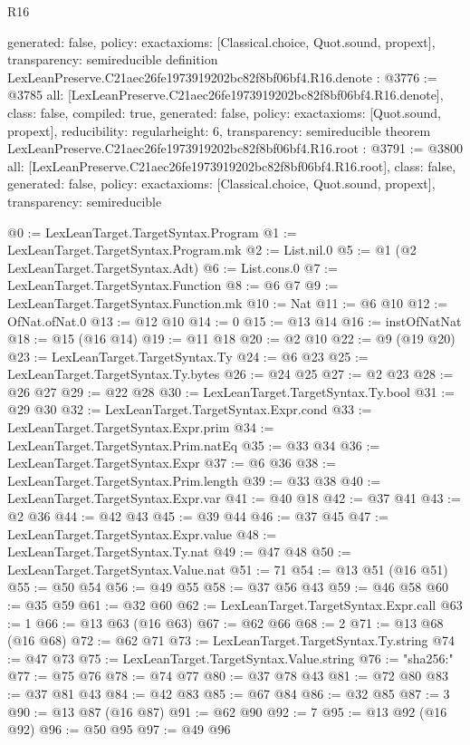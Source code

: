 \begin{lexlean}{R16}
\begin{coremodule}
{  generated: false,
  policy: exact{axioms: [Classical.choice, Quot.sound, propext]},
  transparency: semireducible
}
definition LexLeanPreserve.C21aec26fe1973919202bc82f8bf06bf4.R16.denote : @3776 := @3785 {
  all: [LexLeanPreserve.C21aec26fe1973919202bc82f8bf06bf4.R16.denote],
  class: false,
  compiled: true,
  generated: false,
  policy: exact{axioms: [Quot.sound, propext]},
  reducibility: regular{height: 6},
  transparency: semireducible
}
theorem LexLeanPreserve.C21aec26fe1973919202bc82f8bf06bf4.R16.root : @3791 := @3800 {
  all: [LexLeanPreserve.C21aec26fe1973919202bc82f8bf06bf4.R16.root],
  class: false,
  generated: false,
  policy: exact{axioms: [Classical.choice, Quot.sound, propext]},
  transparency: semireducible
}

@0 := LexLeanTarget.TargetSyntax.Program
@1 := LexLeanTarget.TargetSyntax.Program.mk
@2 := List.nil.{0}
@5 := @1 (@2 LexLeanTarget.TargetSyntax.Adt)
@6 := List.cons.{0}
@7 := LexLeanTarget.TargetSyntax.Function
@8 := @6 @7
@9 := LexLeanTarget.TargetSyntax.Function.mk
@10 := Nat
@11 := @6 @10
@12 := OfNat.ofNat.{0}
@13 := @12 @10
@14 := 0
@15 := @13 @14
@16 := instOfNatNat
@18 := @15 (@16 @14)
@19 := @11 @18
@20 := @2 @10
@22 := @9 (@19 @20)
@23 := LexLeanTarget.TargetSyntax.Ty
@24 := @6 @23
@25 := LexLeanTarget.TargetSyntax.Ty.bytes
@26 := @24 @25
@27 := @2 @23
@28 := @26 @27
@29 := @22 @28
@30 := LexLeanTarget.TargetSyntax.Ty.bool
@31 := @29 @30
@32 := LexLeanTarget.TargetSyntax.Expr.cond
@33 := LexLeanTarget.TargetSyntax.Expr.prim
@34 := LexLeanTarget.TargetSyntax.Prim.natEq
@35 := @33 @34
@36 := LexLeanTarget.TargetSyntax.Expr
@37 := @6 @36
@38 := LexLeanTarget.TargetSyntax.Prim.length
@39 := @33 @38
@40 := LexLeanTarget.TargetSyntax.Expr.var
@41 := @40 @18
@42 := @37 @41
@43 := @2 @36
@44 := @42 @43
@45 := @39 @44
@46 := @37 @45
@47 := LexLeanTarget.TargetSyntax.Expr.value
@48 := LexLeanTarget.TargetSyntax.Ty.nat
@49 := @47 @48
@50 := LexLeanTarget.TargetSyntax.Value.nat
@51 := 71
@54 := @13 @51 (@16 @51)
@55 := @50 @54
@56 := @49 @55
@58 := @37 @56 @43
@59 := @46 @58
@60 := @35 @59
@61 := @32 @60
@62 := LexLeanTarget.TargetSyntax.Expr.call
@63 := 1
@66 := @13 @63 (@16 @63)
@67 := @62 @66
@68 := 2
@71 := @13 @68 (@16 @68)
@72 := @62 @71
@73 := LexLeanTarget.TargetSyntax.Ty.string
@74 := @47 @73
@75 := LexLeanTarget.TargetSyntax.Value.string
@76 := "sha256:"
@77 := @75 @76
@78 := @74 @77
@80 := @37 @78 @43
@81 := @72 @80
@83 := @37 @81 @43
@84 := @42 @83
@85 := @67 @84
@86 := @32 @85
@87 := 3
@90 := @13 @87 (@16 @87)
@91 := @62 @90
@92 := 7
@95 := @13 @92 (@16 @92)
@96 := @50 @95
@97 := @49 @96

\end{coremodule}
\end{lexlean}
